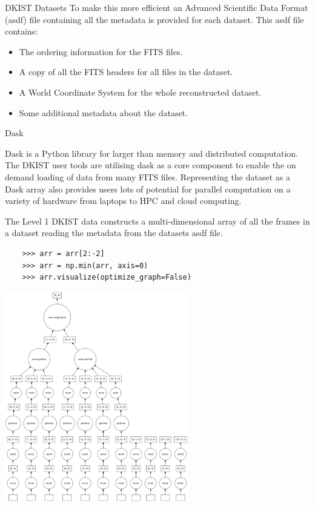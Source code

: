 \documentclass[landscape,a0paper,fontscale=0.32]{baposter}
\begin{document}
\begin{poster}
\begin{posterbox}[name=dataset,column=0,row=0,span=1,below=intro]{DKIST Datasets}
  To make this more efficient an Advanced Scientific Data Format (asdf) file
  containing all the metadata is provided for each dataset. This asdf file
  contains:
  \begin{itemize}
    \item The ordering information for the FITS files.
    \item A copy of all the FITS headers for all files in the dataset.
    \item A World Coordinate System for the whole reconstructed dataset.
    \item Some additional metadata about the dataset.
  \end{itemize}
  
\end{posterbox}

\begin{posterbox}[name=dask,column=1,row=0,span=1,below=intro]{Dask}
  
  Dask is a Python library for larger than memory and distributed computation.
  The DKIST user tools are utilising dask as a core component to enable the on
  demand loading of data from many FITS files. Representing the dataset as a Dask
  array also provides users lots of potential for parallel computation on a
  variety of hardware from laptops to HPC and cloud computing.

  The Level 1 DKIST data constructs a multi-dimensional array of all the frames
  in a dataset reading the metadata from the datasets asdf file.
  
  \begin{verbatim}
    >>> arr = arr[2:-2]
    >>> arr = np.min(arr, axis=0)
    >>> arr.visualize(optimize_graph=False)
  \end{verbatim}

  \begin{center}
    \includegraphics[width=0.6\textwidth]{mydask.png}
  \end{center}


\end{posterbox}
\end{poster}
\end{document}
